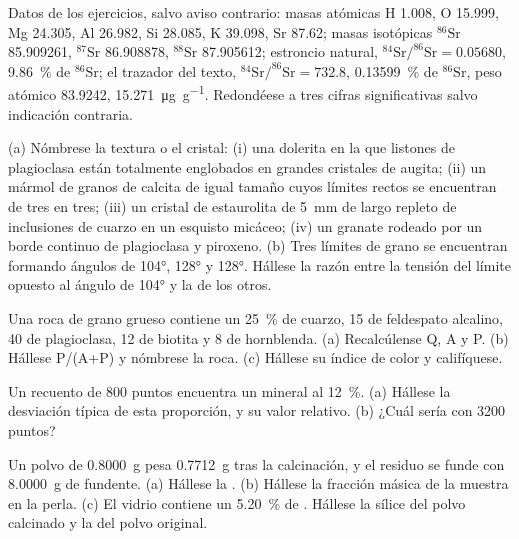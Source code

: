 Datos de los ejercicios, salvo aviso contrario: masas atómicas H 1.008, O 15.999, Mg 24.305, Al
26.982, Si 28.085, K 39.098, Sr 87.62; masas isotópicas $^{86}\mathrm{Sr}$ 85.909261,
$^{87}\mathrm{Sr}$ 86.908878, $^{88}\mathrm{Sr}$ 87.905612; estroncio natural,
$^{84}\mathrm{Sr}/^{86}\mathrm{Sr} = 0.05680$, \qty{9.86}{\percent} de $^{86}\mathrm{Sr}$; el trazador
del texto, $^{84}\mathrm{Sr}/^{86}\mathrm{Sr} = 732.8$, \qty{0.13599}{\percent} de
$^{86}\mathrm{Sr}$, peso atómico 83.9242, \qty{15.271}{\micro\gram\per\gram}. Redondéese a tres
cifras significativas salvo indicación contraria.

\begin{exercise}[$\star$]\label{exo:b2:field-lab-methods-2:1}
(a) Nómbrese la textura o el cristal: (i) una dolerita en la que listones de plagioclasa están totalmente englobados en
grandes cristales de augita; (ii) un mármol de granos de calcita de igual tamaño cuyos límites rectos se encuentran de
tres en tres; (iii) un cristal de estaurolita de \qty{5}{mm} de largo repleto de inclusiones de cuarzo en un esquisto micáceo;
(iv) un granate rodeado por un borde continuo de plagioclasa y piroxeno. (b) Tres límites de grano
se encuentran formando ángulos de \ang{104}, \ang{128} y \ang{128}. Hállese la razón entre la tensión del límite opuesto
al ángulo de \ang{104} y la de los otros.
\end{exercise}

\begin{exercise}[$\star$]\label{exo:b2:field-lab-methods-2:2}
Una roca de grano grueso contiene un \qty{25}{\percent} de cuarzo, 15 de feldespato alcalino, 40 de plagioclasa, 12 de
biotita y 8 de hornblenda. (a) Recalcúlense Q, A y P. (b) Hállese P/(A+P) y nómbrese la roca. (c) Hállese
su índice de color y califíquese.
\end{exercise}

\begin{exercise}[$\star$]\label{exo:b2:field-lab-methods-2:3}
Un recuento de 800 puntos encuentra un mineral al \qty{12}{\percent}. (a) Hállese la desviación típica de
esta proporción, y su valor relativo. (b) ¿Cuál sería con 3200 puntos?
\end{exercise}

\begin{exercise}[$\star$]\label{exo:b2:field-lab-methods-2:4}
Un polvo de \qty{0.8000}{g} pesa \qty{0.7712}{g} tras la calcinación, y el residuo se funde con
\qty{8.0000}{g} de fundente. (a) Hállese la . (b) Hállese la fracción másica de la muestra en
la perla. (c) El vidrio contiene un \qty{5.20}{\percent} de . Hállese la sílice del polvo calcinado
y la del polvo original.
\end{exercise}

